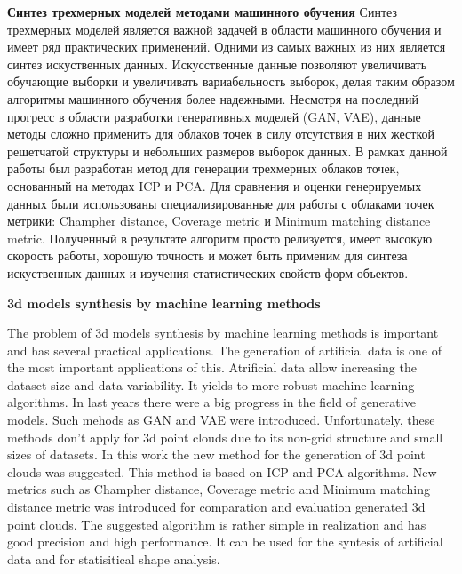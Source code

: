 \textbf{Синтез трехмерных моделей методами машинного обучения}
\newline
Синтез трехмерных моделей является важной задачей в области машинного обучения и имеет ряд практических применений. Одними из самых важных из них является синтез искуственных данных. Искусственные данные позволяют увеличивать обучающие выборки и увеличивать вариабельность выборок, делая таким образом алгоритмы машинного обучения более надежными. Несмотря на последний прогресс в области разработки генеративных моделей (GAN, VAE), данные методы сложно применить для облаков точек в силу отсутствия в них жесткой решетчатой структуры и небольших размеров выборок данных. В рамках данной работы был разработан метод для генерации трехмерных облаков точек, основанный на методах ICP и PCA. Для сравнения и оценки генерируемых данных были использованы специализированные для работы с облаками точек метрики: Champher distance, Coverage metric и Minimum matching distance metric. Полученный в результате алгоритм просто релизуется, имеет высокую скорость работы, хорошую точность и может быть применим для синтеза искуственных данных и изучения статистических свойств форм объектов.


\textbf{3d models synthesis by machine learning methods}
\newline

The problem of 3d models synthesis by machine learning methods is important and has several practical applications.
The generation of artificial data is one of the most important applications of this. Atrificial data allow increasing the dataset size and data variability. It yields to more robust machine learning algorithms.
In last years there were a big progress in the field of generative models. Such mehods as GAN and VAE were introduced. Unfortunately, these methods don't apply for 3d point clouds due to its non-grid structure and small sizes of datasets. In this work the new method for the generation of 3d point clouds was suggested. This method is based on ICP and PCA algorithms. New metrics such as Champher distance, Coverage metric and Minimum matching distance metric was introduced for comparation and evaluation generated 3d point clouds. The suggested algorithm is rather simple in realization and has good precision and high performance. It can be used for the syntesis of artificial data and for statisitical shape analysis.